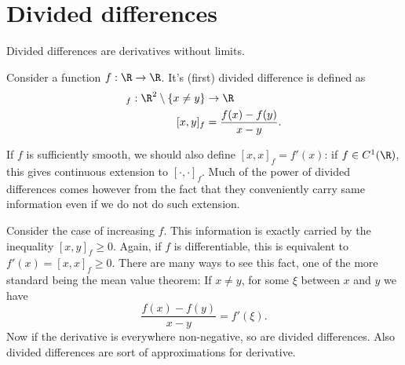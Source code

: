 \chapter{Divided differences}

Divided differences are derivatives without limits.

Consider a function $f : \R \to \R$. It's (first) divided difference is defined as
\begin{align*}
	[\cdot , \cdot]_{f} : \R^{2} \setminus \{x \neq y\} &\to \R \\
	[x, y]_{f} &= \frac{f(x) - f(y)}{x - y}.
\end{align*}

If $f$ is sufficiently smooth, we should also define $[x, x]_{f} = f'(x)$: if $f \in C^{1}(\R)$, this gives continuous extension to $[\cdot, \cdot]_{f}$. Much of the power of divided differences comes however from the fact that they conveniently carry same information even if we do not do such extension.

Consider the case of increasing $f$. This information is exactly carried by the inequality $[x, y]_{f} \geq 0$. Again, if $f$ is differentiable, this is equivalent to $f'(x) = [x, x]_{f} \geq 0$. There are many ways to see this fact, one of the more standard being the mean value theorem: If $x \neq y$, for some $\xi$ between $x$ and $y$ we have
\[
	\frac{f(x) - f(y)}{x - y} = f'(\xi).
\]
Now if the derivative is everywhere non-negative, so are divided differences. Also divided differences are sort of approximations for derivative.

